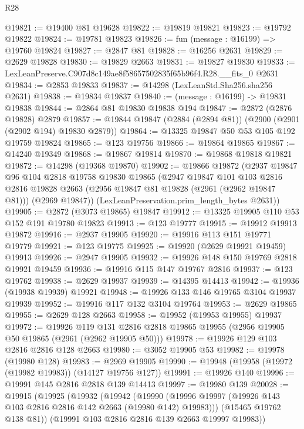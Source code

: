 \begin{lexlean}{R28}
\begin{coremodule}
@19821 := @19400 @81 @19628
@19822 := @19819 @19821
@19823 := @19792 @19822
@19824 := @19781 @19823
@19826 := fun (message : @16199) => @19760 @19824
@19827 := @2847 @81
@19828 := @16256 @2631
@19829 := @2629 @19828
@19830 := @19829 @2663
@19831 := @19827 @19830
@19833 := LexLeanPreserve.C907d8c149ae8f58657502835f65b96f4.R28.__fits_0 @2631
@19834 := @2853 @19833
@19837 := @14298 (LexLeanStd.Sha256.sha256 @2631)
@19838 := @19834 @19837
@19840 := (message : @16199) -> @19831 @19838
@19844 := @2864 @81 @19830 @19838 @194
@19847 := @2872 (@2876 @19828) @2879
@19857 := @19844 @19847 (@2884 (@2894 @81)) (@2900 (@2901 (@2902 @194) @19830 @2879))
@19864 := @13325 @19847 @50 @53 @105 @192 @19759 @19824
@19865 := @123 @19756
@19866 := @19864 @19865
@19867 := @14240 @19349
@19868 := @19867 @19814
@19870 := @19868 @19818 @19821
@19872 := @14298 (@19368 @19870)
@19902 := @19866
    @19872
    (@2937
      @19847
      @96
      @104
      @2818
      @19758
      @19830
      @19865
      (@2947
        @19847
        @101
        @103
        @2816
        @2816
        @19828
        @2663
        (@2956 @19847 @81 @19828 (@2961 (@2962 @19847 @81)))
        (@2969 @19847))
      (LexLeanPreservation.prim_length_bytes @2631))
@19905 := @2872 (@3073 @19865) @19847
@19912 := @13325 @19905 @110 @53 @152 @191 @19780 @19823
@19913 := @123 @19777
@19915 := @19912 @19913 @19872
@19916 := @2937 @19905
@19920 := @19916 @113 @151 @19771 @19779
@19921 := @123 @19775
@19925 := @19920 (@2629 @19921 @19459) @19913
@19926 := @2947 @19905
@19932 := @19926 @148 @150 @19769 @2818 @19921 @19459
@19936 := @19916 @115 @147 @19767 @2816
@19937 := @123 @19762
@19938 := @2629 @19937
@19939 := @14395 @14413
@19942 := @19936 (@19938 @19939) @19921
@19948 := @19926 @133 @146 @19765 @3104 @19937 @19939
@19952 := @19916 @117 @132 @3104 @19764
@19953 := @2629 @19865
@19955 := @2629 @128 @2663
@19958 := @19952 (@19953 @19955) @19937
@19972 := @19926
    @119
    @131
    @2816
    @2818
    @19865
    @19955
    (@2956 @19905 @50 @19865 (@2961 (@2962 @19905 @50)))
@19978 := @19926 @129 @103 @2816 @2816 @128 @2663
@19980 := @3052 @19905 @53
@19982 := @19978 (@19980 @128)
@19983 := @2969 @19905
@19990 := @19948 (@19958 (@19972 (@19982 @19983)) (@14127 @19756 @127))
@19991 := @19926 @140
@19996 := @19991 @145 @2816 @2818 @139 @14413
@19997 := @19980 @139
@20028 := @19915
    (@19925
      (@19932
        (@19942
          (@19990 (@19996 @19997 (@19926 @143 @103 @2816 @2816 @142 @2663 (@19980 @142) @19983)))
          (@15465 @19762 @138 @81))
        (@19991 @103 @2816 @2816 @139 @2663 @19997 @19983))

\end{coremodule}
\end{lexlean}
